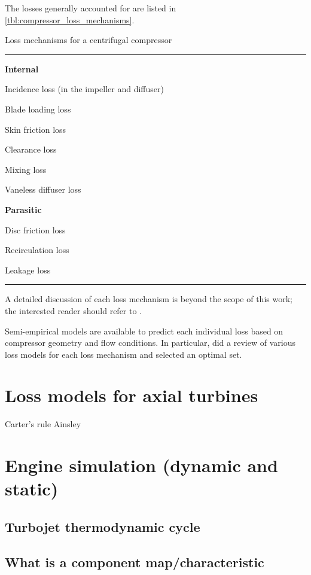 \documentclass[tcc]{subfiles}
\begin{document}
The losses generally accounted for are listed in \cref{tbl:compressor_loss_mechanisms}.
\begin{table}
\caption{Loss mechanisms for a centrifugal compressor}
\label{tbl:compressor_loss_mechanisms}
\hrule
\begin{multicols}{2}
\begin{compactitem}
    \item[] \textbf{Internal}
    \item Incidence loss (in the impeller and diffuser)
    \item Blade loading loss
    \item Skin friction loss
    \item Clearance loss
    \item Mixing loss
    \item Vaneless diffuser loss
    \columnbreak
    \item[] \textbf{Parasitic}
    \item Disc friction loss
    \item Recirculation loss
    \item Leakage loss
\end{compactitem}
\end{multicols}
\hrule
{}
\end{table}

A detailed discussion of each loss mechanism is beyond the scope of this work; 
the interested reader should refer to \textcite{Cumpsty2004}. 

Semi-empirical models are available to predict each individual loss based on compressor geometry and flow conditions. 
In particular, \textcite{Oh1997} did a review of various loss models for each loss mechanism and selected an optimal set.

\section{Loss models for axial turbines}
Carter's rule
Ainsley

\section{Engine simulation (dynamic and static)}
\subsection{Turbojet thermodynamic cycle}
\subsection{What is a component map/characteristic}
\end{document}
